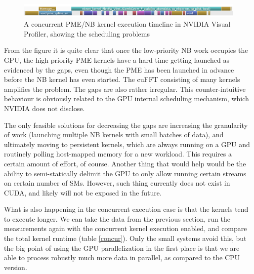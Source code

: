 \documentclass[12pt,a4paper]{report}
\begin{document}
\FloatBarrier
\begin{figure} [h!]
    \centering
    \includegraphics[width=1\textwidth]{pics/overlap-crop.png}
    \caption{A concurrent PME/NB kernel execution timeline in NVIDIA Visual Profiler, showing the scheduling problems}
    \label{fig:overlap}
\end{figure}
\FloatBarrier

From the figure it is quite clear that once the low-priority NB work occupies the GPU, the high priority PME kernels have a hard time getting launched as evidenced by the gaps, even though the PME has been launched in advance before the NB kernel has even started. The cuFFT consisting of many kernels amplifies the problem. The gaps are also rather irregular. This counter-intuitive behaviour is obviously related to the GPU internal scheduling mechanism, which NVIDIA does not disclose. 

The only feasible solutions for decreasing the gaps are increasing the granularity of work (launching multiple NB kernels with small batches of data), and ultimately moving to persistent kernels, which are always running on a GPU and routinely polling host-mapped memory for a new workload. This requires a certain amount of effort, of course. Another thing that would help would be the ability to semi-statically delimit the GPU to only allow running certain streams on certain number of SMs. However, such thing currently does not exist in CUDA, and likely will not be exposed in the future.

 What is also happening in the concurrent execution case is that the kernels tend to execute longer. We can take the data from the previous section, run the measurements again with the concurrent kernel execution enabled, and compare the total kernel runtime (table \ref{concur}). Only the small systems avoid this, but the big point of using the GPU parallelization in the first place is that we are able to process robustly much more data in parallel, as compared to the CPU version. 
 
\end{document}
